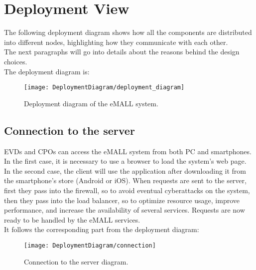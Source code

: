 \section{Deployment View}
\label{sec: deployment_view}%
The following deployment diagram shows how all the components are distributed into different nodes,
highlighting how they communicate with each other. \\
The next paragraphs will go into details about the reasons behind the design choices. \\
The deployment diagram is:
\begin{figure} [H]
    \begin{center}
        \texttt{[image: DeploymentDiagram/deployment\_diagram]}
        \caption{Deployment diagram of the eMALL system.}
        \label{fig: depl_diagram}
    \end{center}
\end{figure}

\subsection{Connection to the server}
\label{subsec:connection_to_the_server}%
EVDs and CPOs can access the eMALL system from both PC and smartphones.
In the first case, it is necessary to use a browser to load the system's web page.
In the second case, the client will use the application after downloading it from the smartphone's store (Android or iOS).
When requests are sent to the server, first they pass into the firewall, so to avoid eventual cyberattacks on the system,
then they pass into the load balancer, so to optimize resource usage,
improve performance, and increase the availability of several services.
Requests are now ready to be handled by the eMALL services. \\
It follows the corresponding part from the deployment diagram:
\begin{figure} [H]
    \begin{center}
        \texttt{[image: DeploymentDiagram/connection]}
        \caption{Connection to the server diagram.}
        \label{fig: connection}
    \end{center}
\end{figure}

